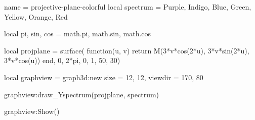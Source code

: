 \documentclass{standalone}
\begin{document}
\begin{luadraw}{name = projective-plane-colorful}
local spectrum = {Purple, Indigo, Blue, Green, Yellow, Orange, Red}

local pi, sin, cos = math.pi, math.sin, math.cos

local projplane = surface(
  function(u, v)
    return M(3*v*cos(2*u), 3*v*sin(2*u), 3*v*cos(u))
  end,
  0, 2*pi, 0, 1,
  {50, 30})

local graphview = graph3d:new{
  size    = {12, 12},
  viewdir = {170, 80}
}

graphview:draw_Yspectrum(projplane, spectrum)

graphview:Show()
\end{luadraw}
\end{document}
